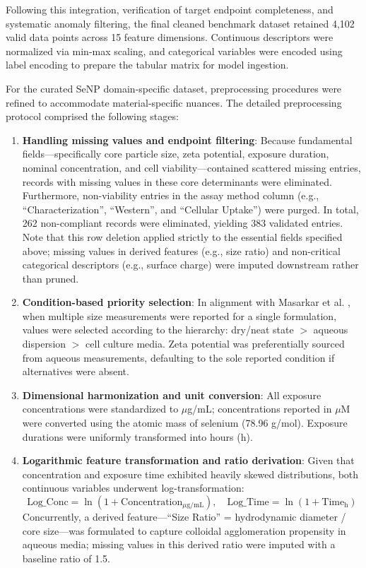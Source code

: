 \documentclass[letterpaper]{article}
\begin{document}
Following this integration, verification of target endpoint completeness, and systematic anomaly filtering, the final cleaned benchmark dataset retained 4,102 valid data points across 15 feature dimensions. Continuous descriptors were normalized via min-max scaling, and categorical variables were encoded using label encoding to prepare the tabular matrix for model ingestion.

For the curated SeNP domain-specific dataset, preprocessing procedures were refined to accommodate material-specific nuances. The detailed preprocessing protocol comprised the following stages:

\begin{enumerate}
  \item \textbf{Handling missing values and endpoint filtering}: Because fundamental fields—specifically core particle size, zeta potential, exposure duration, nominal concentration, and cell viability—contained scattered missing entries, records with missing values in these core determinants were eliminated. Furthermore, non-viability entries in the assay method column (e.g., ``Characterization'', ``Western'', and ``Cellular Uptake'') were purged. In total, 262 non-compliant records were eliminated, yielding 383 validated entries. Note that this row deletion applied strictly to the essential fields specified above; missing values in derived features (e.g., size ratio) and non-critical categorical descriptors (e.g., surface charge) were imputed downstream rather than pruned.

  \item \textbf{Condition-based priority selection}: In alignment with Masarkar et al. \cite{masarkar2024}, when multiple size measurements were reported for a single formulation, values were selected according to the hierarchy: dry/neat state $>$ aqueous dispersion $>$ cell culture media. Zeta potential was preferentially sourced from aqueous measurements, defaulting to the sole reported condition if alternatives were absent.

  \item \textbf{Dimensional harmonization and unit conversion}: All exposure concentrations were standardized to $\mu$g/mL; concentrations reported in $\mu$M were converted using the atomic mass of selenium (78.96 g/mol). Exposure durations were uniformly transformed into hours (h).

  \item \textbf{Logarithmic feature transformation and ratio derivation}: Given that concentration and exposure time exhibited heavily skewed distributions, both continuous variables underwent log-transformation:
        \[
          \text{Log\_Conc} = \ln(1 + \text{Concentration}_{\mu\text{g/mL}}), \quad
          \text{Log\_Time} = \ln(1 + \text{Time}_{\text{h}})
        \]
        Concurrently, a derived feature—``Size Ratio'' = hydrodynamic diameter / core size—was formulated to capture colloidal agglomeration propensity in aqueous media; missing values in this derived ratio were imputed with a baseline ratio of 1.5.


\end{enumerate}
\end{document}

